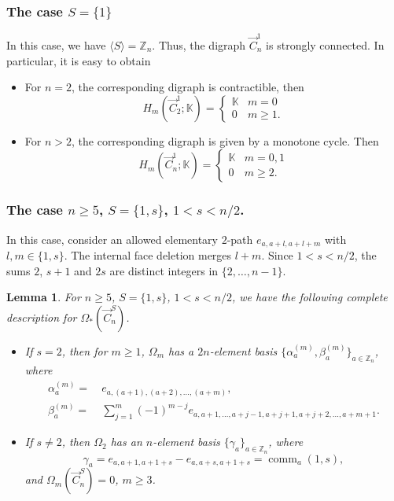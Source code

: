 \documentclass[11pt]{amsart}
\newcommand{\Z}{\mathbb Z}
\newcommand{\K}{\mathbb K}
\theoremstyle{plain}
\newtheorem{lemma}[theorem]{Lemma}
\theoremstyle{definition}
\numberwithin{equation}{section}
\begin{document}
\subsubsection{The case \texorpdfstring{$S=\{1\}$}{S1}}

In this case, we have $\langle S\rangle=\Z_n$. Thus, the digraph $\vec{C}_n^1$ is strongly connected. In particular, it is easy to obtain
\begin{itemize}
    \item[(1)] For $n=2$, the corresponding digraph is contractible, then 
    \[H_m(\vec{C}_2^1;\K)=\begin{cases}
        \K & m=0\\
        0 & m\ge 1.
    \end{cases}\] 
    \item[(2)] For $n>2$, the corresponding digraph is given by a monotone cycle. Then
    \[H_m(\vec{C}_n^1;\K)=\begin{cases}
        \K & m=0,1\\
        0 & m\ge 2.
    \end{cases}\]
\end{itemize}


\subsubsection{The case \texorpdfstring{$n\ge 5$, $S=\{1,s\}$, $1<s<n/2$}{S1s}.}
In this case, consider an allowed elementary $2$-path $e_{a,a+l,a+l+m}$ with $l,m\in\{1,s\}$.
The internal face deletion merges $l+m$.
Since $1<s<n/2$, the sums $2$, $s+1$ and $2s$ are distinct integers in $\{2,\dots,n-1\}$.

\begin{lemma} For $n\ge 5$, $S=\{1,s\}$, $1<s<n/2$, we have the following complete description for $\Omega_*(\vec{C}_n^S)$.
\begin{itemize}
\item[(1)] If $s=2$, then for $m\ge1$, $\Omega_m$ has a $2n$-element basis $\{\alpha_a^{(m)},\beta_a^{(m)}\}_{a\in\Z_n}$, where
\begin{align*}
\alpha_a^{(m)}=~&e_{a,(a+1),(a+2),\ldots,(a+m)},\\
\beta_a^{(m)}=~&\sum_{j=1}^m(-1)^{m-j}e_{a,a+1,\ldots,a+j-1,a+j+1,a+j+2,\ldots,a+m+1}.
\end{align*}
\item[(2)] If $s\ne 2$, then $\Omega_2$ has an $n$-element basis $\{\gamma_a\}_{a\in\Z_n}$, where
\[
 \gamma_a=e_{a,a+1,a+1+s}-e_{a,a+s,a+1+s}=\operatorname{comm}_a(1,s),
\]
and $\Omega_m(\vec{C}_n^S)=0$, $m\geq3$.
\end{itemize}
\end{lemma}
\end{document}

